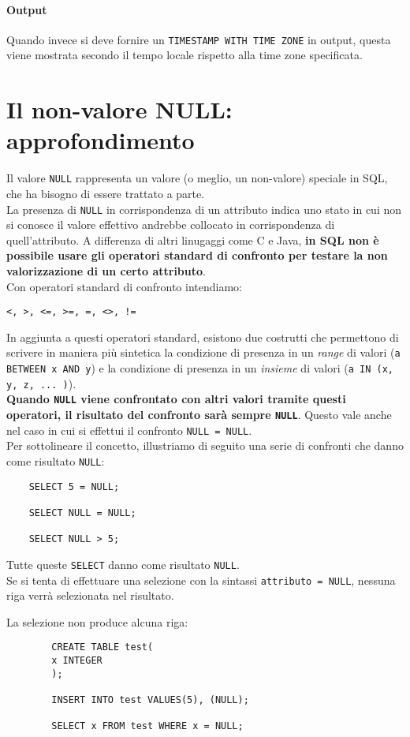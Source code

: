 \documentclass[12pt,a4paper]{book}
\begin{document}
	\paragraph{Output} Quando invece si deve fornire un \texttt{TIMESTAMP WITH TIME ZONE} in output, questa viene mostrata secondo il tempo locale rispetto alla time zone specificata.
	\section{Il non-valore NULL: approfondimento} 
	Il valore \texttt{NULL} rappresenta un valore (o meglio, un non-valore) speciale in SQL, che ha bisogno di essere trattato a parte. \\La presenza di \texttt{NULL} in corrispondenza di un attributo indica uno stato in cui non si conosce il valore effettivo andrebbe collocato in corrispondenza di quell'attributo. A differenza di altri linugaggi come C e Java, \textbf{in SQL non è possibile usare gli operatori standard di confronto per testare la non valorizzazione di un certo attributo}.\\Con operatori standard di confronto intendiamo:
	\begin{center}
		\texttt{<, >, <=, >=, =, <>, !=}
	\end{center}
	In aggiunta a questi operatori standard, esistono due costrutti che permettono di scrivere in maniera più sintetica la condizione di presenza in un \textit{range} di valori (\texttt{a BETWEEN x AND y}) e la condizione di presenza in un \textit{insieme} di valori (\texttt{a IN (x, y, z, ... )}).\\
	\textbf{Quando \texttt{NULL} viene confrontato con altri valori tramite questi operatori, il risultato del confronto sarà sempre \texttt{NULL}}. Questo vale anche nel caso in cui si effettui il confronto \texttt{NULL = NULL}.\\
	Per sottolineare il concetto, illustriamo di seguito una serie di confronti che danno come risultato \texttt{NULL}:
	\begin{lstlisting}
	SELECT 5 = NULL;
	
	SELECT NULL = NULL;
	
	SELECT NULL > 5;
	\end{lstlisting}
	Tutte queste \texttt{SELECT} danno come risultato \texttt{NULL}.\\
	Se si tenta di effettuare una selezione con la sintassi \texttt{attributo = NULL}, nessuna riga verrà selezionata nel risultato.
	\begin{tcolorbox}[enhanced jigsaw, breakable,title=Esempio, title filled]
		La selezione non produce alcuna riga:
		\begin{lstlisting}
		CREATE TABLE test( 
		x INTEGER 
		);
		
		INSERT INTO test VALUES(5), (NULL);
		
		SELECT x FROM test WHERE x = NULL;
		\end{lstlisting}
	\end{tcolorbox}
\end{document}
